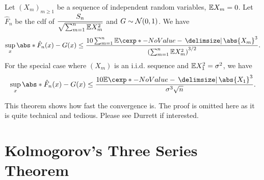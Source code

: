 \documentclass[12pt]{article}
\begin{document}
%
\begin{Theorem}
Let $(X_m)_{m\geq1}$ be a sequence of independent random variables, $\E X_m = 0$. Let $\hat{F}_n$ be the cdf of $\dfrac{S_n}{\sqrt{\sum_{m=1}^n \E X_m^2}}$ and $G \sim \mathcal{N} (0, 1)$. We have
\begin{align*}
\sup_x \abs*{\hat{F}_n(x) - G(x)} \leq \frac{10 \sum_{m=1}^n \E \abs{X_m}^3}{\left(\sum_{m=1}^n \E X_m^2\right)^{3/2}}.
\end{align*}
%
For the special case where $(X_m)$ is an i.i.d. sequence and $\E X_1^2 = \sigma^2$, we have
\begin{align*}
\sup_x \abs*{\hat{F}_n(x) - G(x)} \leq \frac{10 \E \abs{X_1}^3}{\sigma^3 \sqrt{n}}.
\end{align*}
\end{Theorem}
This theorem shows how fast the convergence is. The proof is omitted here as it is quite technical and tedious. Please see Durrett if interested. 

\section{Kolmogorov's Three Series Theorem}
\end{document}
